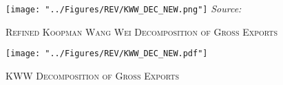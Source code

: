 \documentclass[a4paper]{article}
\begin{document}
\begin{figure}[h!] 
\centering
\caption{\label{fig:KWW}\textsc{Refined Koopman Wang Wei Decomposition of Gross Exports}}
\texttt{[image: "../Figures/REV/KWW\_DEC\_NEW.png"]} \raggedleft
\scriptsize
\emph{Source:} \citet{antras2022global}
\end{figure}
\FloatBarrier

\vspace{1cm}

\begin{figure}[h!]
\centering
\caption{\label{fig:KWW_fill_ts}\textsc{KWW Decomposition of Gross Exports}}
\texttt{[image: "../Figures/REV/KWW\_DEC\_NEW.pdf"]} \end{figure}
\FloatBarrier


\newpage
\end{document}
